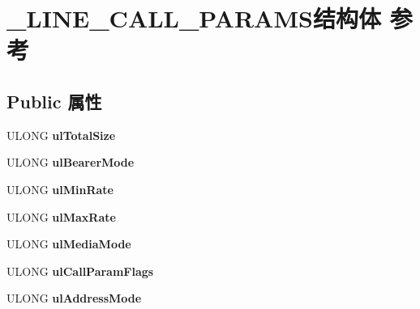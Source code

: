 \hypertarget{struct___l_i_n_e___c_a_l_l___p_a_r_a_m_s}{}\section{\+\_\+\+L\+I\+N\+E\+\_\+\+C\+A\+L\+L\+\_\+\+P\+A\+R\+A\+M\+S结构体 参考}
\label{struct___l_i_n_e___c_a_l_l___p_a_r_a_m_s}
\subsection*{Public 属性}
\begin{DoxyCompactItemize}
\item 
\mbox{\label{struct___l_i_n_e___c_a_l_l___p_a_r_a_m_s_a4d0c64c54905114595c7704f31e955d1}} 
U\+L\+O\+NG {\bfseries ul\+Total\+Size}
\item 
\mbox{\label{struct___l_i_n_e___c_a_l_l___p_a_r_a_m_s_af5d5aeee4d71444399eb643a8ee7725b}} 
U\+L\+O\+NG {\bfseries ul\+Bearer\+Mode}
\item 
\mbox{\label{struct___l_i_n_e___c_a_l_l___p_a_r_a_m_s_a483b0cdba37b416e73be6d0ca2ab78ac}} 
U\+L\+O\+NG {\bfseries ul\+Min\+Rate}
\item 
\mbox{\label{struct___l_i_n_e___c_a_l_l___p_a_r_a_m_s_a1f6ccd9962d8dc776e55c70748e1c41a}} 
U\+L\+O\+NG {\bfseries ul\+Max\+Rate}
\item 
\mbox{\label{struct___l_i_n_e___c_a_l_l___p_a_r_a_m_s_a3f00b938ec5a0b587d0ab0f8dec8555c}} 
U\+L\+O\+NG {\bfseries ul\+Media\+Mode}
\item 
\mbox{\label{struct___l_i_n_e___c_a_l_l___p_a_r_a_m_s_ac2860c0e09a4fa6eeec07452a1a59524}} 
U\+L\+O\+NG {\bfseries ul\+Call\+Param\+Flags}
\item 
\mbox{\label{struct___l_i_n_e___c_a_l_l___p_a_r_a_m_s_ad25d7fbf68f97885e6989df62839ba2c}} 
U\+L\+O\+NG {\bfseries ul\+Address\+Mode}
\item 

\end{DoxyCompactItemize}

